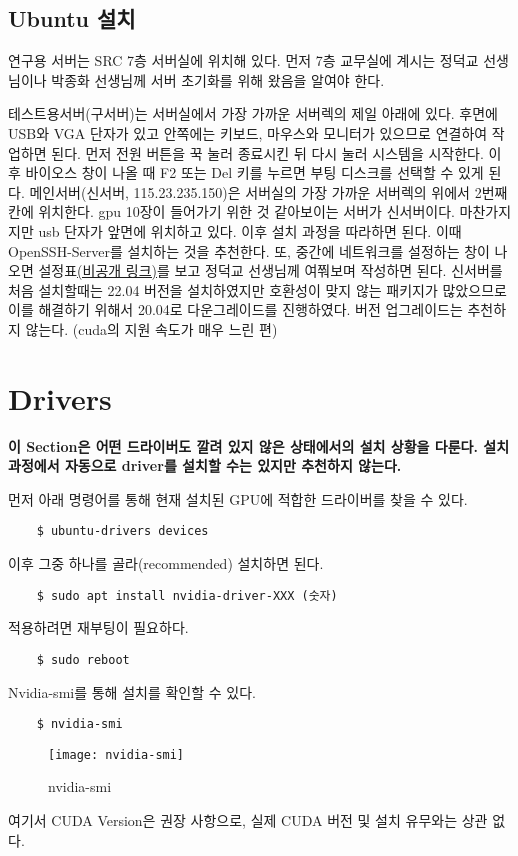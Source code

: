 \subsection{Ubuntu 설치}
연구용 서버는 SRC 7층 서버실에 위치해 있다. 먼저 7층 교무실에 계시는 정덕교 선생님이나 박종화 선생님께 서버 초기화를 위해 왔음을 알여야 한다. 

테스트용서버(구서버)는 서버실에서 가장 가까운 서버렉의 제일 아래에 있다. 후면에 USB와 VGA 단자가 있고 안쪽에는 키보드, 마우스와 모니터가 있으므로 연결하여 작업하면 된다. 먼저 전원 버튼을 꾹 눌러 종료시킨 뒤 다시 눌러 시스템을 시작한다. 이후 바이오스 창이 나올 때 F2 또는 Del 키를 누르면 부팅 디스크를 선택할 수 있게 된다.
메인서버(신서버, 115.23.235.150)은 서버실의 가장 가까운 서버렉의 위에서 2번째 칸에 위치한다. gpu 10장이 들어가기 위한 것 같아보이는 서버가 신서버이다. 마찬가지지만 usb 단자가 앞면에 위치하고 있다. 
이후 설치 과정을 따라하면 된다. 이때 OpenSSH-Server를 설치하는 것을 추천한다. 또, 중간에 네트워크를 설정하는 창이 나오면 설정표\href{https://github.com/gshslinuxintro/Server-Configuration/blob/main/Network.md}{(비공개 링크)}를 보고 정덕교 선생님께 여쭤보며 작성하면 된다. 신서버를 처음 설치할때는 22.04 버전을 설치하였지만 호환성이 맞지 않는 패키지가 많았으므로 이를 해결하기 위해서 20.04로 다운그레이드를 진행하였다. 버전 업그레이드는 추천하지 않는다. (cuda의 지원 속도가 매우 느린 편)

\section{Drivers}
\textbf{이 Section은 어떤 드라이버도 깔려 있지 않은 상태에서의 설치 상황을 다룬다. 설치과정에서 자동으로 driver를 설치할 수는 있지만 추천하지 않는다.}

먼저 아래 명령어를 통해 현재 설치된 GPU에 적합한 드라이버를 찾을 수 있다.
\begin{lstlisting}
    $ ubuntu-drivers devices
\end{lstlisting}
이후 그중 하나를 골라(recommended) 설치하면 된다.
\begin{lstlisting}
    $ sudo apt install nvidia-driver-XXX (숫자)
\end{lstlisting}
적용하려면 재부팅이 필요하다.
\begin{lstlisting}
    $ sudo reboot
\end{lstlisting}
Nvidia-smi를 통해 설치를 확인할 수 있다.
\begin{lstlisting}
    $ nvidia-smi
\end{lstlisting}
\begin{figure}[H]
	\begin{center}
        \texttt{[image: nvidia-smi]}
        \caption{nvidia-smi}
    \end{center}
\end{figure}
여기서 CUDA Version은 권장 사항으로, 실제 CUDA 버전 및 설치 유무와는 상관 없다.


